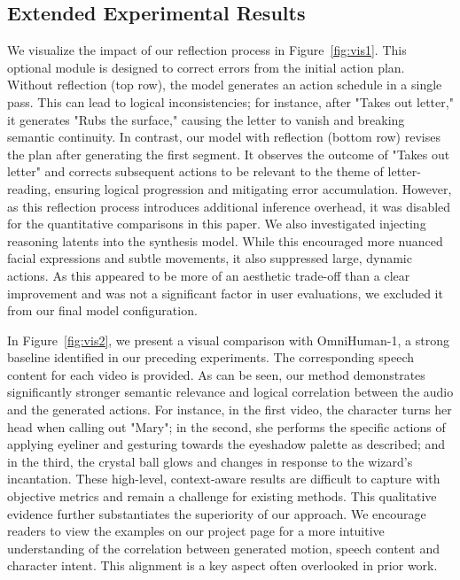 \subsection{Extended Experimental Results}


We visualize the impact of our reflection process in Figure~\ref{fig:vis1}. This optional module is designed to correct errors from the initial action plan. Without reflection (top row), the model generates an action schedule in a single pass. This can lead to logical inconsistencies; for instance, after "Takes out letter," it generates "Rubs the surface," causing the letter to vanish and breaking semantic continuity.
In contrast, our model with reflection (bottom row) revises the plan after generating the first segment. It observes the outcome of "Takes out letter" and corrects subsequent actions to be relevant to the theme of letter-reading, ensuring logical progression and mitigating error accumulation. However, as this reflection process introduces additional inference overhead, it was disabled for the quantitative comparisons in this paper.
We also investigated injecting reasoning latents into the synthesis model. While this encouraged more nuanced facial expressions and subtle movements, it also suppressed large, dynamic actions. As this appeared to be more of an aesthetic trade-off than a clear improvement and was not a significant factor in user evaluations, we excluded it from our final model configuration.

In Figure~\ref{fig:vis2}, we present a visual comparison with OmniHuman-1, a strong baseline identified in our preceding experiments. The corresponding speech content for each video is provided. As can be seen, our method demonstrates significantly stronger semantic relevance and logical correlation between the audio and the generated actions. For instance, in the first video, the character turns her head when calling out "Mary"; in the second, she performs the specific actions of applying eyeliner and gesturing towards the eyeshadow palette as described; and in the third, the crystal ball glows and changes in response to the wizard's incantation. These high-level, context-aware results are difficult to capture with objective metrics and remain a challenge for existing methods. This qualitative evidence further substantiates the superiority of our approach. We encourage readers to view the examples on our project page for a more intuitive understanding of the correlation between generated motion, speech content and character intent. This alignment is a key aspect often overlooked in prior work.



